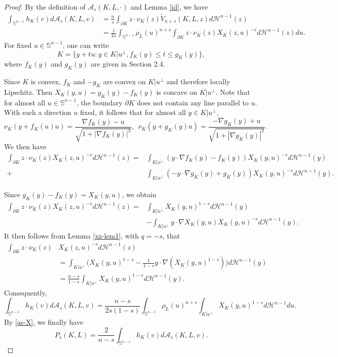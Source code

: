 \documentclass[12pt, oneside,reqno]{amsart}
\numberwithin{equation}{section}
\newtheorem{definition and theorem}[theorem]{Definition and Theorem}
\newcommand{\tA}{\mathcal{A}_s}
\theoremstyle{plain}
\theoremstyle{remark}
\theoremstyle{definition}
\newcommand{\sn}{{\mathbb S}^{n-1}}
\newcommand{\tH}{\mathcal{H}}
\begin{document}
\begin{proof}

   By the definition of $\mathcal{A}_s(K,L,\cdot)$ and Lemma \ref{id}, we have
   \begin{align*}
   \int_{\sn}h_K(v)d\mathcal{A}_s(K,L,v)&=\frac{n}{s}\int_{\partial K} z\cdot \nu_K(z) \tilde{V}_{n+s}(K,L,z)d\tH^{n-1}(z)\\
   &=\frac{1}{2s}\int_{\sn}\rho_L(u)^{n+s}\int_{\partial K} z\cdot\nu_K(z) X_K(z,u)^{-s}d\tH^{n-1}(z)du.
   \end{align*}
   For fixed $u\in\sn$, one can write
   \[K=\{y+tu: y\in K|u^{\perp}, f_K(y)\leq t\leq g_K(y) \},\]
   where $f_K(y)$ and $g_K(y)$ are given in Section 2.4.
   
   Since $K$ is convex, $f_K$ and $-g_K$ are convex on $K|u^{\perp}$ and therefore locally Lipschitz. Then $X_K(y,u)=g_K(y)-f_K(y)$ is concave on $K|u^{\perp}$. Note that for almost all $u\in\sn$, the boundary $\partial K$ does not contain any line parallel to $u$. With such a direction $u$ fixed, it follows that for almost all $y\in K|u^{\perp}$, 
   \[\nu_K(y+f_K(u)u)=\frac{\nabla f_K(y)-u}{\sqrt{1+|\nabla f_K(y)|^2}},~~\nu_K(y+g_K(y)u)=\frac{-\nabla g_K(y)+u}{\sqrt{1+|\nabla g_K(y)|^2}}.\]  
   We then have
   \begin{align*}
       \int_{\partial K} z\cdot\nu_K(z) X_K(z,u)^{-s}d\tH^{n-1}(z)=&\int_{K|u^{\perp}}( y\cdot\nabla f_K(y) -f_K(y))X_K(y,u)^{-s}d\tH^{n-1}(y)\\
       +&\int_{K|u^{\perp}}(- y\cdot\nabla g_K(y) +g_K(y))X_K(y,u)^{-s}d\tH^{n-1}(y).
   \end{align*}

   Since $g_K(y)-f_K(y)=X_K(y,u)$, we obtain
   \begin{align*}
       \int_{\partial K} z\cdot \nu_K(z) X_K(z,u)^{-s}d\tH^{n-1}(z)=&\int_{K|u^{\perp}}X_K(y,u)^{1-s}d\tH^{n-1}(y)\\
       &-\int_{K|u^{\perp}} y\cdot\nabla X_K(y,u) X_K(y,u)^{-s}d\tH^{n-1}(y).
   \end{align*}
   It then follows from Lemma \ref{xz-lem1}, with $q=-s$, that
   \begin{align*}
       \int_{\partial K} z\cdot \nu_K(z) &X_K(z,u)^{-s}d\tH^{n-1}(z)\\&=\int_{K|u^{\perp}}\Big(X_K(y,u)^{1-s}-\frac{1}{1-s} y\cdot \nabla (X_K(y,u)^{1-s}) \Big)d\tH^{n-1}(y)\\
       &=\frac{n-s}{1-s}\int_{K|u^{\perp}} X_K(y,u)^{1-s}d\tH^{n-1}(y).
   \end{align*}
   Consequently,
   \[\int_{\sn}h_K(v)d\tA(K,L,v)=\frac{n-s}{2s(1-s)}\int_{\sn}\rho_L(u)^{n+s}\int_{K|u^{\perp}}X_K(y,u)^{1-s}d\tH^{n-1}du.\]
   By \eqref{as-X}, we finally have
   \begin{equation}\label{as-int}
      P_s(K,L)=\frac{2}{n-s}\int_{\sn}h_K(v)d\tA(K,L,v). 
   \end{equation}
   

\end{proof}
\end{document}
